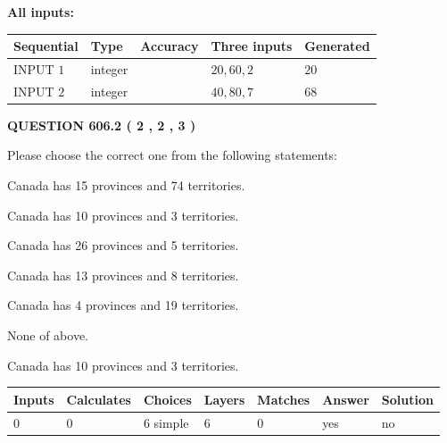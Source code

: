 \documentclass[12pt]{article}
\begin{document}
   
   
   
\noindent\vspace{0.1in}\hspace{-0.08in} {\textbf{\Large{All inputs: }}}
   
   
  
  
\noindent\begin{tabular}{|l|l|l|l|l|}
\hline
 Sequential & Type & Accuracy & Three inputs & Generated \\ 
\hline
 
 
  INPUT $  1 $ & integer &  & $
 20
 , 
 60
 , 
 2
 $ & $ 20 $ 
 \\  \hline  
 
 
  INPUT $  2 $ & integer &  & $
 40
 , 
 80
 , 
 7
 $ & $ 68 $ 
 \\  \hline  
 \end{tabular}
   
   
  
\vspace{0.2in}
  
{\textbf{\Large{QUESTION
606.2 
 ( 2 , 2 , 3 )
}}}
  
  
Please choose the correct one from the following statements:
 
 
Canada has  15 provinces and  74 territories.
 
 
Canada has 10  provinces and 3 territories.
 
 
Canada has  26 provinces and  5 territories.
 
 
Canada has  13 provinces and  8 territories.
 
 
Canada has   4 provinces and  19 territories.
 
 
 None of above.
 
 
\noindent{}
 
 
Canada has 10  provinces and 3 territories.
 
 
\noindent{}
 
 
   
   
   
   
\noindent\begin{tabular}{|l|l|l|l|l|l|l|}
 \hline
Inputs & Calculates & Choices & Layers & Matches & Answer & Solution \\ \hline
 0  & 
 0  & 
 6
  simple  
  & 
 6  & 
 0  & 
  yes & 
  no 
  \\ \hline
 \end{tabular}
   
\end{document}
